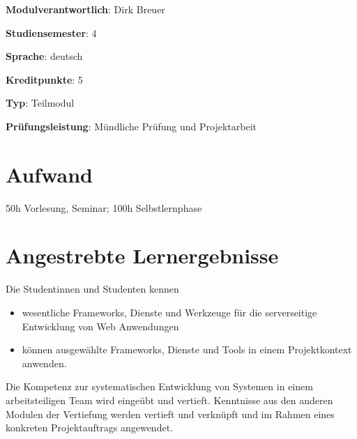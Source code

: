 \begin{modulHead}
\textbf{Modulverantwortlich}: Dirk
Breuer
\end{modulHead}
\begin{modulHead}
\textbf{Studiensemester}:
4
\end{modulHead}
\begin{modulHead}
\textbf{Sprache}:
deutsch
\end{modulHead}
\begin{modulHead}
\textbf{Kreditpunkte}:
5
\end{modulHead}
\begin{modulHead}
\textbf{Typ}:
Teilmodul
\end{modulHead}
\begin{modulHead}
\textbf{Prüfungsleistung}:
Mündliche Prüfung und Projektarbeit
\end{modulHead}


\hypertarget{aufwandpathlabelmi-2017modulbeschreibungen-bachelorba_wd_frameworks-daten-und-dienste}{%
\section*{Aufwand\label{/mi-2017/modulbeschreibungen-bachelor/BA_WD_Frameworks-daten-und-dienste}}\label{aufwandpathlabelmi-2017modulbeschreibungen-bachelorba_wd_frameworks-daten-und-dienste}}

50h Vorlesung, Seminar; 100h Selbstlernphase

\hypertarget{angestrebte-lernergebnissepathlabelmi-2017modulbeschreibungen-bachelorba_wd_frameworks-daten-und-dienste}{%
\section*{Angestrebte
Lernergebnisse\label{/mi-2017/modulbeschreibungen-bachelor/BA_WD_Frameworks-daten-und-dienste}}\label{angestrebte-lernergebnissepathlabelmi-2017modulbeschreibungen-bachelorba_wd_frameworks-daten-und-dienste}}

Die Studentinnen und Studenten kennen

\begin{itemize}
\tightlist
\item
  wesentliche Frameworks, Dienste und Werkzeuge für die serverseitige
  Entwicklung von Web Anwendungen
\item
  können ausgewählte Frameworks, Dienste und Tools in einem
  Projektkontext anwenden.
\end{itemize}

Die Kompetenz zur systematischen Entwicklung von Systemen in einem
arbeitsteiligen Team wird eingeübt und vertieft. Kenntnisse aus den
anderen Modulen der Vertiefung werden vertieft und verknüpft und im
Rahmen eines konkreten Projektauftrags angewendet.


